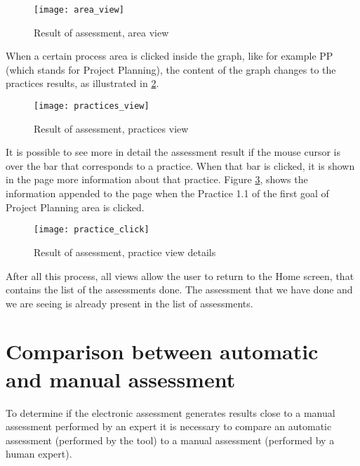 \begin{figure}[h]
	\begin{center}
		\leavevmode
		\texttt{[image: area\_view]}
		\caption{Result of assessment, area view}
		\label{fig:area_view}
	\end{center}
\end{figure}

When a certain process area is clicked inside the graph, like for example PP (which stands for Project Planning), the content of the graph changes to the practices results, as illustrated in \ref{fig:practices_view}.


\begin{figure}[h]
	\begin{center}
		\leavevmode
		\texttt{[image: practices\_view]}
		\caption{Result of assessment, practices view}
		\label{fig:practices_view}
	\end{center}
\end{figure}

It is possible to see more in detail the assessment result if the mouse cursor is over the bar that corresponds to a practice. When that bar is clicked, it is shown in the page more information about that practice. Figure \ref{fig:practice_click}, shows the information appended to the page when the Practice 1.1 of the first goal of Project Planning area is clicked.

\begin{figure}[!htb]
	\begin{center}
		\leavevmode
		\texttt{[image: practice\_click]}
		\caption{Result of assessment, practice view details}
		\label{fig:practice_click}
	\end{center}
\end{figure}

After all this process, all views allow the user to return to the Home screen, that contains the list of the assessments done. The assessment that we have done and we are seeing is already present in the list of assessments.
 
\section{Comparison between automatic and manual assessment} \label{sec:automatic}

To determine if the electronic assessment generates results close to a manual assessment performed by an expert it is necessary to compare an automatic assessment (performed by the tool) to a manual assessment (performed by a human expert).

